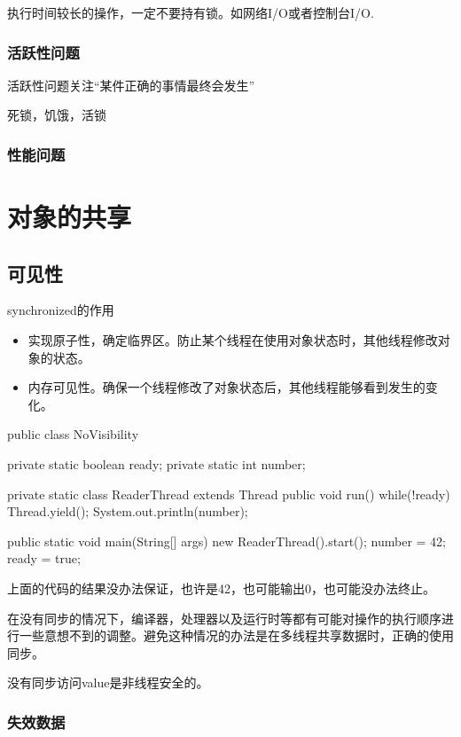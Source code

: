 执行时间较长的操作，一定不要持有锁。如网络I/O或者控制台I/O.



\subsubsection{活跃性问题}

活跃性问题关注“某件正确的事情最终会发生”

死锁，饥饿，活锁

\subsubsection{性能问题}

\section{对象的共享}

\subsection{可见性}

synchronized的作用
\begin{itemize}
\item 实现原子性，确定临界区。防止某个线程在使用对象状态时，其他线程修改对象的状态。
\item 内存可见性。确保一个线程修改了对象状态后，其他线程能够看到发生的变化。
\end{itemize}

\begin{Java}
public class NoVisibility {
	private static boolean ready;
	private static int number;
	
	private static class ReaderThread extends Thread {
		public void run() {
			while(!ready){
				Thread.yield();
			}
			System.out.println(number);
		}
	}
	
	public static void main(String[] args) {
		new ReaderThread().start();
		number = 42;
		ready = true;
	}
}
\end{Java}

上面的代码的结果没办法保证，也许是42，也可能输出0，也可能没办法终止。

在没有同步的情况下，编译器，处理器以及运行时等都有可能对操作的执行顺序进行一些意想不到的调整。避免这种情况的办法是在多线程共享数据时，正确的使用同步。


没有同步访问value是非线程安全的。


\subsubsection{失效数据}

